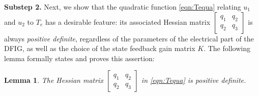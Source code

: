 \documentclass[journal]{IEEEtran}
\newtheorem{lemma}{Lemma}
\begin{document}
{\bf Substep 2.} Next, we show that the quadratic function \eqref{eqn:Tequa} relating $u_1$ and $u_2$ to $T_e$ has a desirable feature: its associated Hessian matrix $\left[\begin{smallmatrix}
q_1 & q_2 \\
q_2 & q_3
\end{smallmatrix}\right]$
is always {\em positive definite}, regardless of the parameters of the electrical part of the DFIG, as well as the choice of the state feedback gain matrix $K$. The following lemma formally states and proves this assertion:

\begin{lemma} \label{lemma:posdef} The Hessian matrix
$\left[\begin{smallmatrix}
q_1 & q_2 \\
q_2 & q_3
\end{smallmatrix}\right]$ in \eqref{eqn:Tequa}
is positive definite.
\end{lemma}
\end{document}
